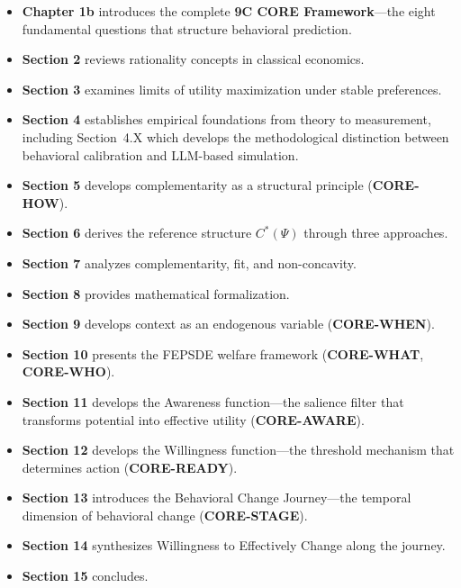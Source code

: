 \begin{itemize}
    \item \textbf{Chapter 1b} introduces the complete \textbf{9C CORE Framework}---the eight fundamental questions that structure behavioral prediction.

    \item \textbf{Section 2} reviews rationality concepts in classical economics.

    \item \textbf{Section 3} examines limits of utility maximization under stable preferences.

    \item \textbf{Section 4} establishes empirical foundations from theory to measurement, including Section~4.X which develops the methodological distinction between behavioral calibration and LLM-based simulation.

    \item \textbf{Section 5} develops complementarity as a structural principle (\textbf{CORE-HOW}).

    \item \textbf{Section 6} derives the reference structure $C^*(\Psi)$ through three approaches.

    \item \textbf{Section 7} analyzes complementarity, fit, and non-concavity.

    \item \textbf{Section 8} provides mathematical formalization.

    \item \textbf{Section 9} develops context as an endogenous variable (\textbf{CORE-WHEN}).

    \item \textbf{Section 10} presents the FEPSDE welfare framework (\textbf{CORE-WHAT}, \textbf{CORE-WHO}).

    \item \textbf{Section 11} develops the Awareness function---the salience filter that transforms potential into effective utility (\textbf{CORE-AWARE}).

    \item \textbf{Section 12} develops the Willingness function---the threshold mechanism that determines action (\textbf{CORE-READY}).

    \item \textbf{Section 13} introduces the Behavioral Change Journey---the temporal dimension of behavioral change (\textbf{CORE-STAGE}).

    \item \textbf{Section 14} synthesizes Willingness to Effectively Change along the journey.

    \item \textbf{Section 15} concludes.
\end{itemize}

